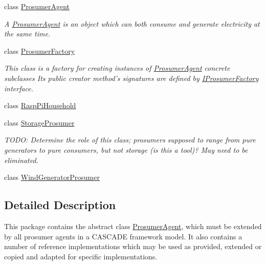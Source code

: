 \begin{DoxyCompactItemize}
\item 
class \hyperlink{classuk_1_1ac_1_1dmu_1_1iesd_1_1cascade_1_1agents_1_1prosumers_1_1_prosumer_agent}{Prosumer\-Agent}
\begin{DoxyCompactList}\small\item\em A {\itshape \hyperlink{classuk_1_1ac_1_1dmu_1_1iesd_1_1cascade_1_1agents_1_1prosumers_1_1_prosumer_agent}{Prosumer\-Agent}} is an object which can both consume and generate electricity at the same time. \end{DoxyCompactList}\item 
class \hyperlink{classuk_1_1ac_1_1dmu_1_1iesd_1_1cascade_1_1agents_1_1prosumers_1_1_prosumer_factory}{Prosumer\-Factory}
\begin{DoxyCompactList}\small\item\em This class is a factory for creating instances of {\ttfamily \hyperlink{classuk_1_1ac_1_1dmu_1_1iesd_1_1cascade_1_1agents_1_1prosumers_1_1_prosumer_agent}{Prosumer\-Agent}} concrete subclasses Its public creator method's signatures are defined by \hyperlink{interfaceuk_1_1ac_1_1dmu_1_1iesd_1_1cascade_1_1agents_1_1prosumers_1_1_i_prosumer_factory}{I\-Prosumer\-Factory} interface. \end{DoxyCompactList}\item 
class \hyperlink{classuk_1_1ac_1_1dmu_1_1iesd_1_1cascade_1_1agents_1_1prosumers_1_1_rasp_pi_household}{Rasp\-Pi\-Household}
\item 
class \hyperlink{classuk_1_1ac_1_1dmu_1_1iesd_1_1cascade_1_1agents_1_1prosumers_1_1_storage_prosumer}{Storage\-Prosumer}
\begin{DoxyCompactList}\small\item\em T\-O\-D\-O\-: Determine the role of this class; prosumers supposed to range from pure generators to pure consumers, but not storage (is this a tool)? May need to be eliminated. \end{DoxyCompactList}\item 
class \hyperlink{classuk_1_1ac_1_1dmu_1_1iesd_1_1cascade_1_1agents_1_1prosumers_1_1_wind_generator_prosumer}{Wind\-Generator\-Prosumer}
\end{DoxyCompactItemize}


\subsection{Detailed Description}
This package contains the abstract class \hyperlink{classuk_1_1ac_1_1dmu_1_1iesd_1_1cascade_1_1agents_1_1prosumers_1_1_prosumer_agent}{Prosumer\-Agent}, which must be extended by all prosumer agents in a C\-A\-S\-C\-A\-D\-E framework model. It also contains a number of reference implementations which may be used as provided, extended or copied and adapted for specific implementations. 